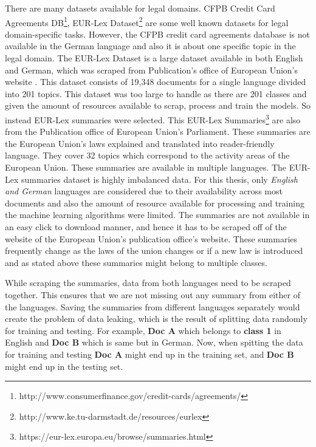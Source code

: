 There are many datasets available for legal domains. CFPB Credit Card Agreements DB\footnote{http://www.consumerfinance.gov/credit-cards/agreements/}, EUR-Lex Dataset\footnote{http://www.ke.tu-darmstadt.de/resources/eurlex} are some well known datasets for legal domain-specific tasks. However, the CFPB credit card agreements database is not available in the German language and also it is about one specific topic in the legal domain. The EUR-Lex Dataset is a large dataset available in both English and German, which was scraped from Publication's office of European Union's website \cite{mencia2010efficient}. This dataset consists of 19,348 documents for a single language divided into 201 topics. This dataset was too large to handle as there are 201 classes and given the amount of resources available to scrap, process and train the models. So instead EUR-Lex summaries were selected. This EUR-Lex Summaries\footnote{https://eur-lex.europa.eu/browse/summaries.html} are also from the Publication office of European Union's Parliament. These summaries are the European Union's laws explained and translated into reader-friendly language. They cover 32 topics which correspond to the activity areas of the European Union. These summaries are available in multiple languages. The EUR-Lex summaries dataset is highly imbalanced data. For this thesis, only \textit{English and German} languages are considered due to their availability across most documents and also the amount of resource available for processing and training the machine learning algorithms were limited. The summaries are not available in an easy click to download manner, and hence it has to be scraped off of the website of the European Union's publication office's website. These summaries frequently change as the laws of the union changes or if a new law is introduced and as stated above these summaries might belong to multiple classes. 

While scraping the summaries, data from both languages need to be scraped together. This ensures that we are not missing out any summary from either of the languages. Saving the summaries from different languages separately would create the problem of data leaking, which is the result of splitting data randomly for training and testing. For example, \textbf{Doc A} which belongs to \textbf{class 1} in English and \textbf{Doc B} which is same but in German. Now, when spitting the data for training and testing \textbf{Doc A} might end up in the training set, and \textbf{Doc B} might end up in the testing set. 




